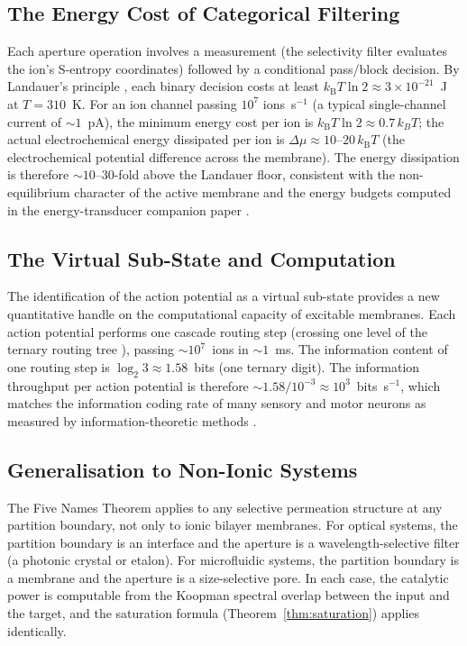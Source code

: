 \documentclass[11pt,twocolumn,a4paper]{article}
\theoremstyle{definition}
\theoremstyle{remark}
\newcommand{\kB}{k_{\mathrm{B}}}
\begin{document}
\subsection{The Energy Cost of Categorical Filtering}

Each aperture operation involves a measurement (the selectivity filter evaluates
the ion's S-entropy coordinates) followed by a conditional pass/block decision.
By Landauer's principle \citep{landauer1961}, each binary decision costs at
least $\kB T \ln 2 \approx 3 \times 10^{-21}$~J at $T = 310$~K.
For an ion channel passing $10^7$ ions~s$^{-1}$ (a typical single-channel
current of $\sim 1$~pA), the minimum energy cost per ion is
$\kB T \ln 2 \approx 0.7\,k_BT$; the actual electrochemical energy dissipated
per ion is $\Delta\mu \approx 10$--$20\,\kB T$ (the electrochemical potential
difference across the membrane). The energy dissipation is therefore
$\sim 10$--$30$-fold above the Landauer floor, consistent with the non-equilibrium
character of the active membrane and the energy budgets computed in the
energy-transducer companion paper \citep{companion4}.

\subsection{The Virtual Sub-State and Computation}

The identification of the action potential as a virtual sub-state provides a
new quantitative handle on the computational capacity of excitable membranes.
Each action potential performs one cascade routing step (crossing one level
of the ternary routing tree \citep{companion5}), passing $\sim 10^7$~ions in
$\sim 1$~ms. The information content of one routing step is
$\log_2 3 \approx 1.58$~bits (one ternary digit). The information throughput
per action potential is therefore $\sim 1.58/10^{-3} \approx 10^3$~bits~s$^{-1}$,
which matches the information coding rate of many sensory and motor neurons
as measured by information-theoretic methods \citep{strong1998}.

\subsection{Generalisation to Non-Ionic Systems}

The Five Names Theorem applies to any selective permeation structure at any
partition boundary, not only to ionic bilayer membranes. For optical
systems, the partition boundary is an interface and the aperture is a
wavelength-selective filter (a photonic crystal or etalon). For microfluidic
systems, the partition boundary is a membrane and the aperture is a
size-selective pore. In each case, the catalytic power is computable from
the Koopman spectral overlap between the input and the target, and the
saturation formula (Theorem~\ref{thm:saturation}) applies identically.
\end{document}
